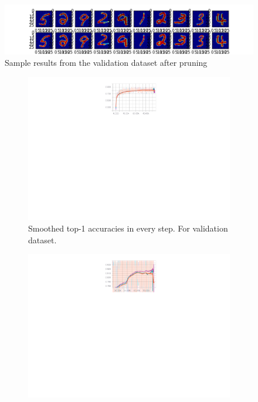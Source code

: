 \begin{figure}[!h]
\centering
\includegraphics[width=1\linewidth]{images/autoencoder_pruned.png}
\caption{Sample results from the validation dataset after pruning}
\label{fig:autoencoder_results}
\end{figure}

\begin{figure}[!h]
  \vspace{-45px}
  \centering
  \begin{subfigure}{.79\textwidth}
        \includegraphics[width=1\linewidth]{images/convolution-comparison-test-dataset-full-accuracy.pdf}
        \caption{Smoothed top-1 accuracies in every step. For validation dataset.}
        \label{fig:conv-comparison-full}
  \end{subfigure}
  \begin{subfigure}{.79\textwidth}
        \includegraphics[width=1\linewidth]{images/convolution-comparison-test-dataset-accuracy-zoomed.pdf}

\end{subfigure}
\end{figure}

